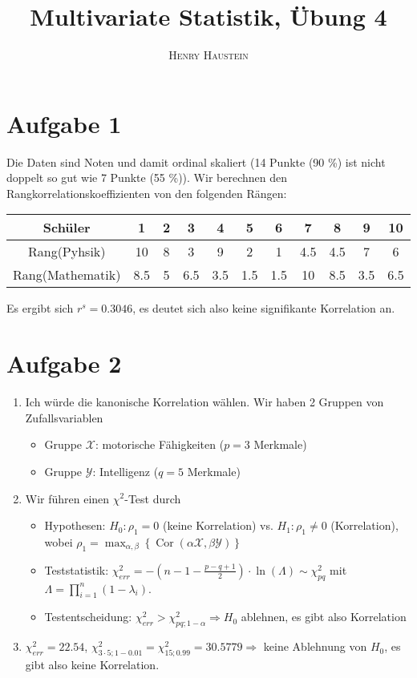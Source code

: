 \documentclass{article}
\title{\textbf{Multivariate Statistik, Übung 4}}
\author{\textsc{Henry Haustein}}
\date{}
\DeclareMathOperator{\Cor}{Cor}
\begin{document}
	\maketitle
	
	\section*{Aufgabe 1}
	Die Daten sind Noten und damit ordinal skaliert (14 Punkte (90 \%) ist nicht doppelt so gut wie 7 Punkte (55 \%)). Wir berechnen den Rangkorrelationskoeffizienten von den folgenden Rängen:
	\begin{center}
		\begin{tabular}{c|cccccccccc}
			Schüler & 1 & 2 & 3 & 4 & 5 & 6 & 7 & 8 & 9 & 10 \\
			\hline
			Rang(Pyhsik) & 10 & 8 & 3 & 9 & 2 & 1 & 4.5 & 4.5 & 7 & 6 \\
			\hline
			Rang(Mathematik) & 8.5 & 5 & 6.5 & 3.5 & 1.5 & 1.5 & 10 & 8.5 & 3.5 & 6.5
		\end{tabular}
	\end{center}
	Es ergibt sich $r^s = 0.3046$, es deutet sich also keine signifikante Korrelation an.

	\section*{Aufgabe 2}
	\begin{enumerate}[label=(\alph*)]
		\item Ich würde die kanonische Korrelation wählen. Wir haben 2 Gruppen von Zufallsvariablen
		\begin{itemize}
			\item Gruppe $\mathcal{X}$: motorische Fähigkeiten ($p=3$ Merkmale)
			\item Gruppe $\mathcal{Y}$: Intelligenz ($q=5$ Merkmale)
		\end{itemize}
		\item Wir führen einen $\chi^2$-Test durch
		\begin{itemize}
			\item Hypothesen: $H_0:\rho_1=0$ (keine Korrelation) vs. $H_1:\rho_1\neq 0$ (Korrelation), wobei $\rho_1=\max_{\alpha,\beta}\left\lbrace \Cor(\alpha\mathcal{X},\beta\mathcal{Y}) \right\rbrace$
			\item Teststatistik: $\chi_{err}^2 = -(n-1-\frac{p-q+1}{2})\cdot\ln(\Lambda)\sim\chi_{pq}^2$ mit $\Lambda=\prod_{i=1}^{n} (1-\lambda_i)$.
			\item Testentscheidung: $\chi_{err}^2 > \chi_{pq;1-\alpha}^2\Rightarrow H_0$ ablehnen, es gibt also Korrelation
		\end{itemize}
		\item $\chi_{err}^2=22.54$, $\chi_{3\cdot 5;1-0.01}^2 = \chi_{15;0.99}^2 = 30.5779 \Rightarrow$ keine Ablehnung von $H_0$, es gibt also keine Korrelation.
	\end{enumerate}
\end{document}
